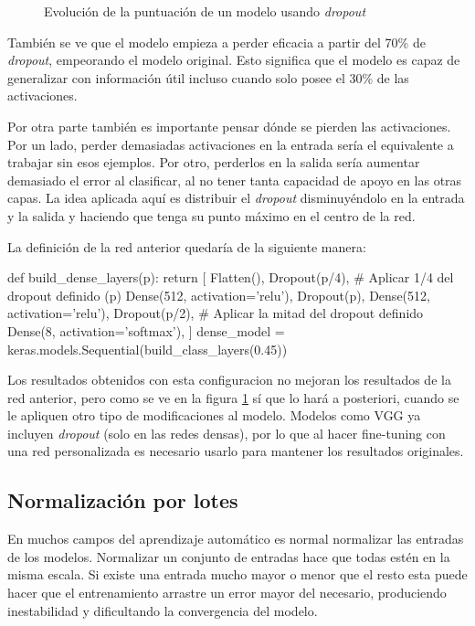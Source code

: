 \begin{figure}
    \caption{Evolución de la puntuación de un modelo usando \textit{dropout}}
\label{dropout}
\end{figure}


También se ve que el modelo empieza a perder eficacia a partir del 70\% de \textit{dropout}, empeorando el modelo original. Esto significa que el modelo es capaz de generalizar con información útil incluso cuando solo posee el 30\% de las activaciones.

Por otra parte también es importante pensar dónde se pierden las activaciones. Por un lado, perder demasiadas activaciones en la entrada sería el equivalente a trabajar sin esos ejemplos. Por otro, perderlos en la salida sería aumentar demasiado el error al clasificar, al no tener tanta capacidad de apoyo en las otras capas.  La idea aplicada aquí es distribuir el \textit{dropout} disminuyéndolo en la entrada y la salida y haciendo que tenga su punto máximo en el centro de la red.

La definición de la red anterior quedaría de la siguiente manera:

\begin{python}
def build_dense_layers(p):
    return [
        Flatten(),
        Dropout(p/4),  # Aplicar 1/4 del dropout definido (p)
        Dense(512, activation='relu'),
        Dropout(p),
        Dense(512, activation='relu'),
        Dropout(p/2),  # Aplicar la mitad del dropout definido
        Dense(8, activation='softmax'),
    ]
dense_model = keras.models.Sequential(build_class_layers(0.45))
\end{python}

Los resultados obtenidos con esta configuracion no mejoran los resultados de la red anterior, pero como se ve en la figura \ref{dropout} sí que lo hará a posteriori, cuando se le apliquen otro tipo de modificaciones al modelo. Modelos como VGG ya incluyen \textit{dropout} (solo en las redes densas), por lo que al hacer fine-tuning con una red personalizada es necesario usarlo para mantener los resultados originales.

\subsection{Normalización por lotes}

En muchos campos del aprendizaje automático es normal normalizar las entradas de los modelos. Normalizar un conjunto de entradas hace que todas estén en la misma escala. Si existe una entrada mucho mayor o menor que el resto esta puede hacer que el entrenamiento arrastre un error mayor del necesario, produciendo inestabilidad y dificultando la convergencia del modelo.

